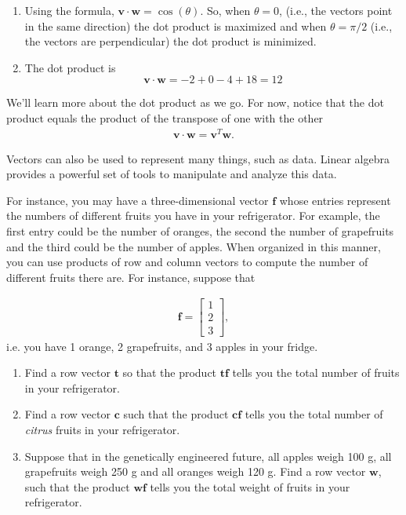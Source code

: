 \begin{sol}
\begin{enumerate}
    \item 
Using the formula, $\mathbf{v}\cdot\mathbf{w}=\cos(\theta)$. So, when $\theta=0$, (i.e., the vectors point in the same direction) the dot product is maximized and when $\theta=\pi/2$ (i.e., the vectors are perpendicular) the dot product is minimized.
\item The dot product is
$$\mathbf{v}\cdot\mathbf{w} = -2 + 0 -4 + 18 = 12$$
\end{enumerate}
\end{sol}
We'll learn more about the dot product as we go. For now, notice that the dot product equals the product of the transpose of one with the other
\begin{align}
\mathbf{v}\cdot \mathbf{w} = \mathbf{v}^T \mathbf{w}.
\end{align}

Vectors can also be used to represent many things, such as data. Linear algebra provides a powerful set of tools to manipulate and analyze this data.

\begin{prob}
\label{ex:fruit}
For instance, you may have a three-dimensional vector $\mathbf{f}$ whose entries represent the numbers of different fruits you have in your refrigerator. For example, the first entry could be the number of oranges, the second the number of grapefruits and the third could be the number of apples. When organized in this manner, you can use products of row and column vectors to compute the number of different fruits there are. For instance, suppose that

\begin{align}
\mathbf{f} = \begin{bmatrix}
1 \\ 2 \\ 3
\end{bmatrix},
\end{align}
 i.e. you have 1 orange, 2 grapefruits, and 3 apples in your fridge.

\begin{enumerate}
\item Find a row vector $\mathbf{t}$ so that the product $\mathbf{t} \mathbf{f}$ tells you the total number of fruits in your refrigerator.
\item Find a row vector $\mathbf{c}$ such that the product $\mathbf{c}\mathbf{f}$ tells you the total number of \emph{citrus} fruits in your refrigerator.
\item Suppose that in the genetically engineered future, all apples weigh 100 g, all grapefruits weigh 250 g and all oranges weigh 120 g. Find a row vector $\mathbf{w}$, such that the product $\mathbf{w}\mathbf{f}$ tells you the total weight of fruits in your refrigerator.
\end{enumerate}
\end{prob}

